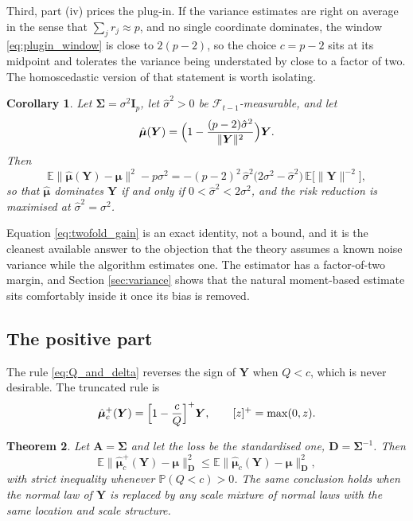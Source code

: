 \documentclass[pdflatex,sn-mathphys-num]{sn-jnl}%
\theoremstyle{thmstyleone}%
\newtheorem{theorem}{Theorem}%
\newtheorem{corollary}[theorem]{Corollary}%
\theoremstyle{thmstyletwo}%
\theoremstyle{thmstylethree}%
\newcommand{\E}{\mathbb{E}}
\begin{document}
Third, part (iv) prices the plug-in. If the variance estimates are right on average in the sense that $\sum_j r_j\approx p$, and no single coordinate dominates, the window \eqref{eq:plugin_window} is close to $2(p-2)$, so the choice $c=p-2$ sits at its midpoint and tolerates the variance being understated by close to a factor of two. The homoscedastic version of that statement is worth isolating.

\begin{corollary}
\label{cor:twofold}
Let $\bm\Sigma=\sigma^2\bm I_p$, let $\hat\sigma^2>0$ be $\mathcal F_{t-1}$-measurable, and let
\begin{equation}
\hat{\bm\mu}(\bm Y)=\Bigl(1-\frac{(p-2)\hat\sigma^2}{\|\bm Y\|^2}\Bigr)\bm Y .
\end{equation}
Then
\begin{equation}
\label{eq:twofold_gain}
\E\|\hat{\bm\mu}(\bm Y)-\bm\mu\|^2-p\sigma^2
=
-(p-2)^2\,\hat\sigma^2\bigl(2\sigma^2-\hat\sigma^2\bigr)\,\E\bigl[\|\bm Y\|^{-2}\bigr],
\end{equation}
so that $\hat{\bm\mu}$ dominates $\bm Y$ if and only if $0<\hat\sigma^2<2\sigma^2$, and the risk reduction is maximised at $\hat\sigma^2=\sigma^2$.
\end{corollary}

Equation \eqref{eq:twofold_gain} is an exact identity, not a bound, and it is the cleanest available answer to the objection that the theory assumes a known noise variance while the algorithm estimates one. The estimator has a factor-of-two margin, and Section \ref{sec:variance} shows that the natural moment-based estimate sits comfortably inside it once its bias is removed.

\subsection{The positive part}

The rule \eqref{eq:Q_and_delta} reverses the sign of $\bm Y$ when $Q<c$, which is never desirable. The truncated rule is
\begin{equation}
\label{eq:positive_part}
\hat{\bm\mu}^{+}_c(\bm Y)=\Bigl[1-\frac{c}{Q}\Bigr]^{+}\bm Y,
\qquad
[z]^{+}=\max(0,z).
\end{equation}

\begin{theorem}
\label{thm:positive_part}
Let $\bm A=\bm\Sigma$ and let the loss be the standardised one, $\bm D=\bm\Sigma^{-1}$. Then
\begin{equation}
\E\bigl\|\hat{\bm\mu}^{+}_c(\bm Y)-\bm\mu\bigr\|^2_{\bm D}
\le
\E\bigl\|\hat{\bm\mu}_c(\bm Y)-\bm\mu\bigr\|^2_{\bm D},
\end{equation}
with strict inequality whenever $\mathbb P(Q<c)>0$. The same conclusion holds when the normal law of $\bm Y$ is replaced by any scale mixture of normal laws with the same location and scale structure.
\end{theorem}
\end{document}
